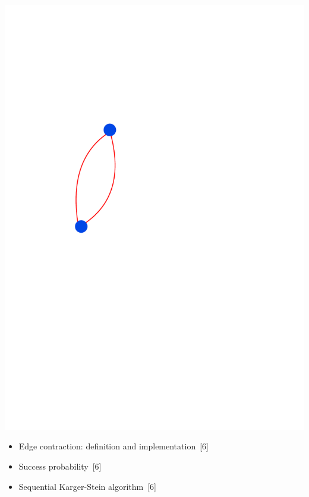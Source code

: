 \documentclass[titlepage,german,presentation]{beamer}
\begin{document}
\begin{frame}
\includegraphics[height=0.6\textheight]{min-cut-7.pdf}
\begin{itemize}
\item Edge contraction: definition and implementation~[6]
\medskip
\item Success probability~[6]
\medskip
\item Sequential Karger-Stein algorithm~[6]
\end{itemize}

\end{frame}
\end{document}
